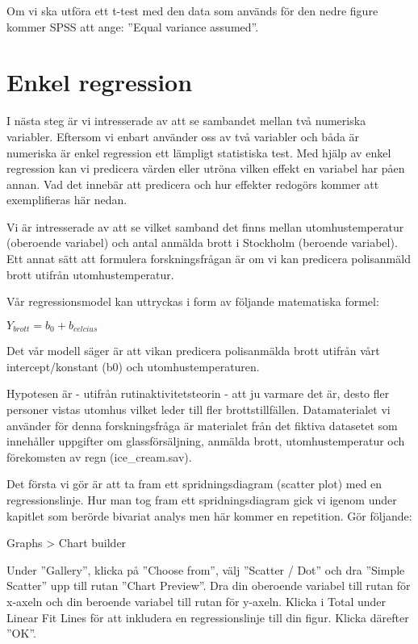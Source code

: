 \documentclass[
]{book}
\begin{document}
Om vi ska utföra ett t-test med den data som används för den nedre figure kommer SPSS att ange: ''Equal variance assumed''.

\hypertarget{enkel-regression}{%
\chapter{Enkel regression}\label{enkel-regression}}

I nästa steg är vi intresserade av att se sambandet mellan två numeriska variabler. Eftersom vi enbart använder oss av två variabler och båda är numeriska är enkel regression ett lämpligt statistiska test. Med hjälp av enkel regression kan vi predicera värden eller utröna vilken effekt en variabel har påen annan. Vad det innebär att predicera och hur effekter redogörs kommer att exemplifieras här nedan.

Vi är intresserade av att se vilket samband det finns mellan utomhustemperatur (oberoende variabel) och antal anmälda brott i Stockholm (beroende variabel). Ett annat sätt att formulera forskningsfrågan är om vi kan predicera polisanmäld brott utifrån utomhustemperatur.

Vår regressionsmodel kan uttryckas i form av följande matematiska formel:

\(Y_{brott} = b_0 + b_{celcius}\)

Det vår modell säger är att vikan predicera polisanmälda brott utifrån vårt intercept/konstant (b0) och utomhustemperaturen.

Hypotesen är - utifrån rutinaktivitetsteorin - att ju varmare det är, desto fler personer vistas utomhus vilket leder till fler brottstillfällen. Datamaterialet vi använder för denna forskningsfråga är materialet från det fiktiva datasetet som innehåller uppgifter om glassförsäljning, anmälda brott, utomhustemperatur och förekomsten av regn (ice\_cream.sav).

Det första vi gör är att ta fram ett spridningsdiagram (scatter plot) med en regressionslinje. Hur man tog fram ett spridningsdiagram gick vi igenom under kapitlet som berörde bivariat analys men här kommer en repetition. Gör följande:

Graphs \textgreater{} Chart builder

Under ''Gallery'', klicka på ''Choose from'', välj ''Scatter / Dot'' och dra ''Simple Scatter'' upp till rutan ''Chart Preview''. Dra din oberoende variabel till rutan för x-axeln och din beroende variabel till rutan för y-axeln. Klicka i Total under Linear Fit Lines för att inkludera en regressionslinje till din figur. Klicka därefter ''OK''.
\end{document}
